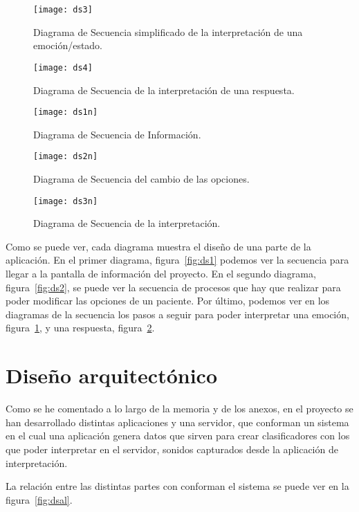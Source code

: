 \begin{figure}[H]
	\centering
	\texttt{[image: ds3]}
	\caption{Diagrama de Secuencia simplificado de la interpretación de una emoción/estado.}
	\label{fig:ds3}
\end{figure}

\begin{figure}[H]
	\centering
	\texttt{[image: ds4]}
	\caption{Diagrama de Secuencia de la interpretación de una respuesta.}
	\label{fig:ds4}
\end{figure}

\begin{figure}[H]
	\centering
	\texttt{[image: ds1n]}
	\caption{Diagrama de Secuencia de Información.}
	\label{fig:ds1n}
\end{figure}

\begin{figure}[H]
	\centering
	\texttt{[image: ds2n]}
	\caption{Diagrama de Secuencia del cambio de las opciones.}
	\label{fig:ds2n}
\end{figure}

\begin{figure}[H]
	\centering
	\texttt{[image: ds3n]}
	\caption{Diagrama de Secuencia de la interpretación.}
	\label{fig:ds3n}
\end{figure}

Como se puede ver, cada diagrama muestra el diseño de una parte de la aplicación. En el primer diagrama, figura~\ref{fig:ds1} podemos ver la secuencia para llegar a la pantalla de información del proyecto. En el segundo diagrama, figura~\ref{fig:ds2}, se puede ver la secuencia de procesos que hay que realizar para poder modificar las opciones de un paciente. Por último, podemos ver en los diagramas de la secuencia los pasos a seguir para poder interpretar una emoción, figura~\ref{fig:ds3}, y una respuesta, figura~\ref{fig:ds4}. 
\section{Diseño arquitectónico}

Como se he comentado a lo largo de la memoria y de los anexos, en el proyecto se han desarrollado distintas aplicaciones y una servidor, que conforman un sistema en el cual una aplicación genera datos que sirven para crear clasificadores con los que poder interpretar en el servidor, sonidos capturados desde la aplicación de interpretación.

La relación entre las distintas partes con conforman el sistema se puede ver en la figura~\ref{fig:dsal}.

